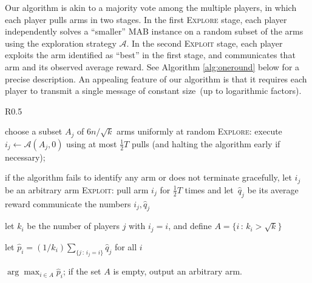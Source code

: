 \documentclass{article} %
\newcommand{\phat}{\hat{p}}
\newcommand{\qhat}{\hat{q}}
\begin{document}
Our algorithm is akin to a majority vote among the multiple players, in which each player pulls arms in two stages. 
In the first \textsc{Explore} stage, each player independently solves a ``smaller'' MAB instance on a random subset of the arms using the exploration strategy $\mathcal{A}$.
In the second \textsc{Exploit} stage, each player exploits the arm identified as ``best'' in the first stage, and communicates that arm and its observed average reward. 
See Algorithm \ref{alg:oneround} below for a precise description.
An appealing feature of our algorithm is that it requires each player to transmit a single message of constant size~(up to logarithmic factors).



\begin{wrapfigure}[21]{R}{0.5\textwidth}\begin{minipage}{0.5\textwidth}
\vspace{-22pt}

\begin{algorithm}[H] \caption{\textsc{One-round Best-arm}} \label{alg:oneround}
\begin{algorithmic}[1]


	\STATE choose a subset $A_j$ of $6 n / \sqrt{k}$ arms uniformly at random
	\STATE \textsc{Explore}: execute $i_j \gets \mathcal{A}(A_j,0)$ using at most $\tfrac{1}{2} T$ pulls (and halting the algorithm early if necessary); 
	
	if the algorithm fails to identify any arm or does not terminate gracefully, let $i_j$ be an arbitrary arm
	\STATE \textsc{Exploit}: pull arm $i_j$ for $\tfrac{1}{2} T$ times and let~$\qhat_j$ be its average reward
	\STATE communicate the numbers $i_j, \qhat_j$
\ENDFOR

\STATE let $k_i$ be the number of players $j$ with $i_j = i$, and 
define $A = \{i \,:\, k_i > \sqrt{k} \}$

\STATE let $\phat_i = (1/k_i) \sum_{\{j \,:\, i_j = i\}} \qhat_j$ for all $i$

 $\arg \max_{i \in A} \phat_i$; if the set $A$ is empty, output an arbitrary arm. 

\end{algorithmic}
\end{algorithm}

\end{minipage}\end{wrapfigure}
\end{document}
